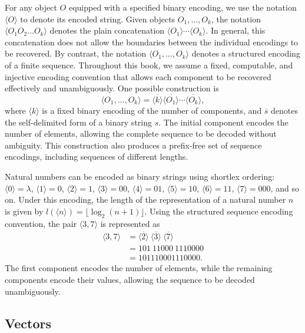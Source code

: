 For any object $O$ equipped with a specified binary encoding, we use the notation $\langle O \rangle$ to denote its encoded string. Given objects $O_1, \ldots, O_k$, the notation $\langle O_1 O_2 \ldots O_k \rangle$ denotes the plain concatenation $\langle O_1 \rangle \cdots \langle O_k \rangle$. In general, this concatenation does not allow the boundaries between the individual encodings to be recovered. By contrast, the notation $\langle O_1, \ldots, O_k \rangle$ denotes a structured encoding of a finite sequence. Throughout this book, we assume a fixed, computable, and injective encoding convention that allows each component to be recovered effectively and unambiguously. One possible construction is
\[
\langle O_1, \ldots, O_k \rangle =
\overline{\langle k \rangle}
\overline{\langle O_1 \rangle}
\cdots
\overline{\langle O_k \rangle},
\]
where $\langle k \rangle$ is a fixed binary encoding of the number of components, and $\overline{s}$ denotes the self-delimited form of a binary string $s$. The initial component encodes the number of elements, allowing the complete sequence to be decoded without ambiguity. This construction also produces a prefix-free set of sequence encodings, including sequences of different lengths.

\begin{example}
Natural numbers can be encoded as binary strings using shortlex ordering: $\langle 0 \rangle = \lambda$, $\langle 1 \rangle = 0$, $\langle 2 \rangle = 1$, $\langle 3 \rangle = 00$, $\langle 4 \rangle = 01$, $\langle 5 \rangle = 10$, $\langle 6 \rangle = 11$, $\langle 7 \rangle = 000$, and so on. Under this encoding, the length of the representation of a natural number $n$ is given by $l(\langle n \rangle) = \lfloor \log_2(n+1) \rfloor$. Using the structured sequence encoding convention, the pair $\langle 3,7 \rangle$ is represented as
\[
\begin{aligned}
\langle 3,7 \rangle
&= \overline{\langle 2 \rangle}
   \ \overline{\langle 3 \rangle}
   \ \overline{\langle 7 \rangle} \\
&= 101\ 11000\ 1110000 \\
&= 101110001110000.
\end{aligned}
\]
The first component encodes the number of elements, while the remaining components encode their values, allowing the sequence to be decoded unambiguously.
\end{example}


\subsection*{Vectors}

